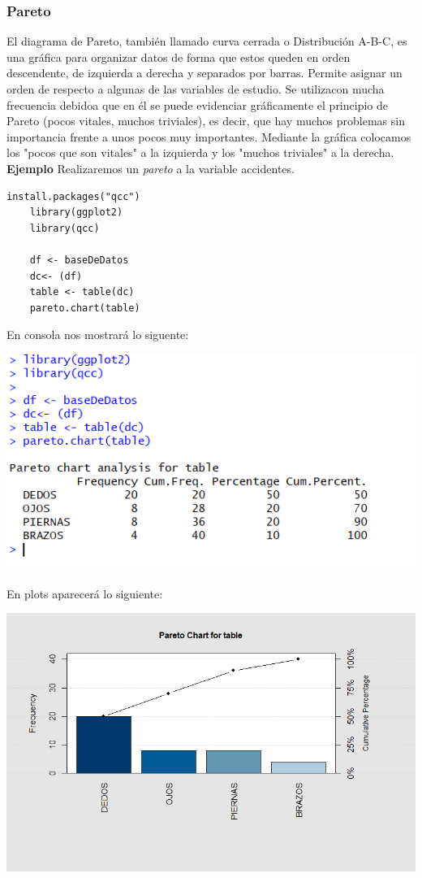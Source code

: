 \documentclass[12pt,hidelinks]{article}
\begin{document}
	\subsubsection{Pareto}
	El diagrama de Pareto, también llamado curva cerrada o Distribución A-B-C, es una gráfica para organizar datos de forma que estos queden en orden descendente, de izquierda a derecha y separados por barras. Permite asignar un orden de respecto a algunas de las variables de estudio. Se utilizacon mucha frecuencia debidoa que en él se puede evidenciar gráficamente el principio de Pareto (pocos vitales, muchos triviales), es decir, que hay muchos problemas sin importancia frente a unos pocos muy importantes. Mediante la gráfica colocamos los "pocos que son vitales" a la izquierda y los "muchos triviales" a la derecha. \textbf{Ejemplo} Realizaremos un \textit{pareto} a la variable accidentes.
	\begin{lstlisting}[frame=single]
	install.packages("qcc")
	library(ggplot2)
	library(qcc)
	
	df <- baseDeDatos
	dc<- (df)
	table <- table(dc)
	pareto.chart(table)
	\end{lstlisting}
	En consola nos mostrará lo siguente:
	\begin{center}
		\includegraphics[]{images/2/imgPareto.PNG}
	\end{center}
	En plots aparecerá lo siguiente:
	\begin{center}
		\includegraphics[width = 15cm]{images/2/Gpareto.png}
	\end{center}
\end{document}
